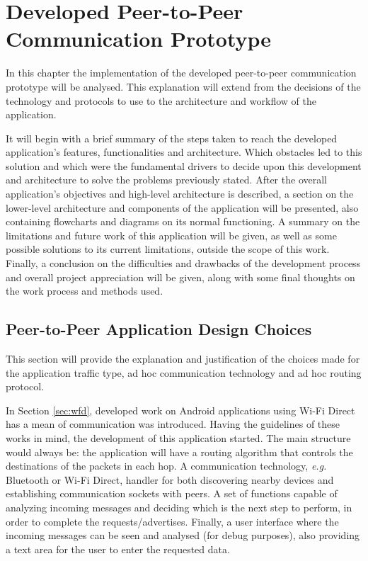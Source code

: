 \chapter{Developed Peer-to-Peer Communication Prototype}
\label{chapter:work}

In this chapter the implementation of the developed peer-to-peer communication prototype will be analysed. This explanation will extend from the decisions of the technology and protocols to use to the architecture and workflow of the application.

It will begin with a brief summary of the steps taken to reach the developed application's features, functionalities and architecture. Which obstacles led to this solution and which were the fundamental drivers to decide upon this development and architecture to solve the problems previously stated. After the overall application's objectives and high-level architecture is described, a section on the lower-level architecture and components of the application will be presented, also containing flowcharts and diagrams on its normal functioning. A summary on the limitations and future work of this application will be given, as well as some possible solutions to its current limitations, outside the scope of this work. Finally, a conclusion on the difficulties and drawbacks of the development process and overall project appreciation will be given, along with some final thoughts on the work process and methods used.

\section{Peer-to-Peer Application Design Choices}

This section will provide the explanation and justification of the choices made for the application traffic type, ad hoc communication technology and ad hoc routing protocol.

In Section \ref{sec:wfd}, developed work on Android applications using Wi-Fi Direct has a mean of communication was introduced. Having the guidelines of these works in mind, the development of this application started. The main structure would always be: the application will have a routing algorithm that controls the destinations of the packets in each hop. A communication technology, \textit{e.g.} Bluetooth or Wi-Fi Direct, handler for both discovering nearby devices and establishing communication sockets with peers. A set of functions capable of analyzing incoming messages and deciding which is the next step to perform, in order to complete the requests/advertises. Finally, a user interface where the incoming messages can be seen and analysed (for debug purposes), also providing a text area for the user to enter the requested data.

